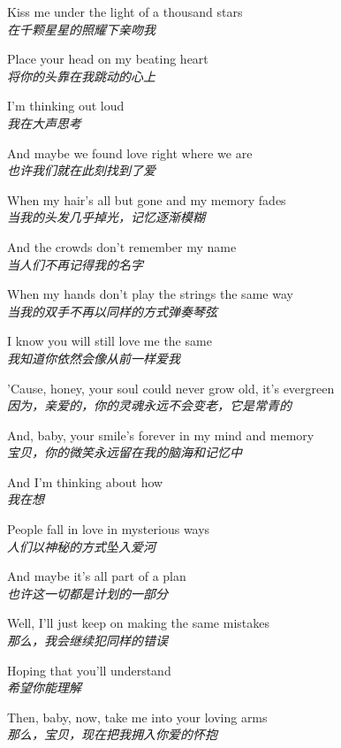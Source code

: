 \begin{spacing}{1.5}
\begin{flushleft}
Kiss me under the light of a thousand stars\\
\textit{在千颗星星的照耀下亲吻我}\lyricspace

Place your head on my beating heart\\
\textit{将你的头靠在我跳动的心上}\lyricspace

I'm thinking out loud\\
\textit{我在大声思考}\lyricspace

And maybe we found love right where we are\\
\textit{也许我们就在此刻找到了爱}\lyricspace

When my hair's all but gone and my memory fades\\
\textit{当我的头发几乎掉光，记忆逐渐模糊}\lyricspace

And the crowds don't remember my name\\
\textit{当人们不再记得我的名字}\lyricspace

When my hands don't play the strings the same way\\
\textit{当我的双手不再以同样的方式弹奏琴弦}\lyricspace

I know you will still love me the same\\
\textit{我知道你依然会像从前一样爱我}\lyricspace

'Cause, honey, your soul could never grow old, it's evergreen\\
\textit{因为，亲爱的，你的灵魂永远不会变老，它是常青的}\lyricspace

And, baby, your smile's forever in my mind and memory\\
\textit{宝贝，你的微笑永远留在我的脑海和记忆中}\lyricspace

And I'm thinking about how\\
\textit{我在想}\lyricspace

People fall in love in mysterious ways\\
\textit{人们以神秘的方式坠入爱河}\lyricspace

And maybe it's all part of a plan\\
\textit{也许这一切都是计划的一部分}\lyricspace

Well, I'll just keep on making the same mistakes\\
\textit{那么，我会继续犯同样的错误}\lyricspace

Hoping that you'll understand\\
\textit{希望你能理解}\lyricspace

Then, baby, now, take me into your loving arms\\
\textit{那么，宝贝，现在把我拥入你爱的怀抱}\lyricspace


\end{flushleft}
\end{spacing}
